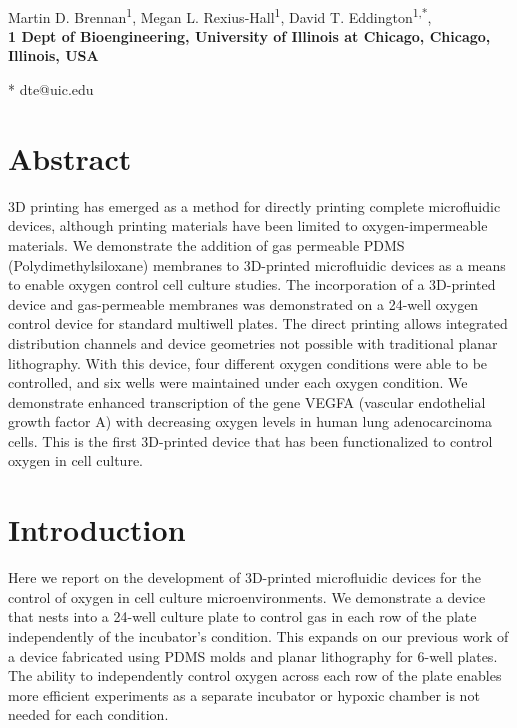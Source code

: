 \documentclass[10pt,letterpaper]{article}
\date{}
\begin{document}
\vspace*{0.35in}

\begin{flushleft}
{\Large
\textbf{}
}
\newline
\\
Martin D. Brennan\textsuperscript{1},
Megan L. Rexius-Hall\textsuperscript{1},
David T. Eddington\textsuperscript{1,*},
\\
\bigskip
\bf{1} Dept of Bioengineering, University of Illinois at Chicago, Chicago, Illinois, USA
\\
\bigskip

* dte@uic.edu

\end{flushleft}
\section*{Abstract}
3D printing has emerged as a method for directly printing complete microfluidic devices, although printing materials have been limited to oxygen-impermeable materials.
We demonstrate the addition of gas permeable PDMS (Polydimethylsiloxane) membranes to 3D-printed microfluidic devices as a means to enable oxygen control cell culture studies.
The incorporation of a 3D-printed device and gas-permeable membranes was demonstrated on a 24-well oxygen control device for standard multiwell plates.
The direct printing allows integrated distribution channels and device geometries not possible with traditional planar lithography.
With this device, four different oxygen conditions were able to be controlled, and six wells were maintained under each oxygen condition. 
We demonstrate enhanced transcription of the gene VEGFA (vascular endothelial growth factor A) with decreasing oxygen levels in human lung adenocarcinoma cells.
This is the first 3D-printed device that has been functionalized to control oxygen in cell culture.
\linenumbers

\section*{Introduction}
Here we report on the development of 3D-printed microfluidic devices for the control of oxygen in cell culture microenvironments.
We demonstrate a device that nests into a 24-well culture plate to control gas in each row of the plate independently of the incubator's condition.
This expands on our previous work of a device fabricated using PDMS molds and planar lithography for 6-well plates\cite{Oppegard2009,Oppegard2010}.
The ability to independently control oxygen across each row of the plate enables more efficient experiments as a separate incubator or hypoxic chamber is not needed for each condition.
\end{document}
